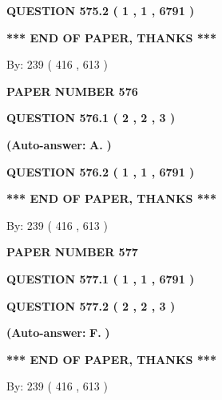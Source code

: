 \documentclass[12pt]{article}
\begin{document}
 
  
  
{\textbf{\large{QUESTION
575.2 
 ( 1 , 1 , 6791 )
}}}
   
   
   
   
\vspace{1.0in} 
{\textbf{\large{ *** END OF PAPER, THANKS *** }}} 
   
   
\hspace{1.0in} By: 
 239 ( 416 ,  613 )
   
   
   
   
\newpage 
\setcounter{page}{ 
   576001 } 
   
   
 {\textbf{ \Large{ PAPER NUMBER  576  }}}
   
   
   
   
  
  
{\textbf{\large{QUESTION
576.1 
 ( 2 , 2 , 3 )
}}}
 
 
{\textbf{(Auto-answer:}}
{\textbf{\large{
A.}}}
{\textbf{)}}
 
 
  
  
{\textbf{\large{QUESTION
576.2 
 ( 1 , 1 , 6791 )
}}}
   
   
   
   
\vspace{1.0in} 
{\textbf{\large{ *** END OF PAPER, THANKS *** }}} 
   
   
\hspace{1.0in} By: 
 239 ( 416 ,  613 )
   
   
   
   
\newpage 
\setcounter{page}{ 
   577001 } 
   
   
 {\textbf{ \Large{ PAPER NUMBER  577  }}}
   
   
   
   
  
  
{\textbf{\large{QUESTION
577.1 
 ( 1 , 1 , 6791 )
}}}
  
  
{\textbf{\large{QUESTION
577.2 
 ( 2 , 2 , 3 )
}}}
 
 
{\textbf{(Auto-answer:}}
{\textbf{\large{
F.}}}
{\textbf{)}}
 
 
   
   
   
   
\vspace{1.0in} 
{\textbf{\large{ *** END OF PAPER, THANKS *** }}} 
   
   
\hspace{1.0in} By: 
 239 ( 416 ,  613 )
   
   
   
   
\newpage 
\setcounter{page}{ 
   578001 } 
   
\end{document}
